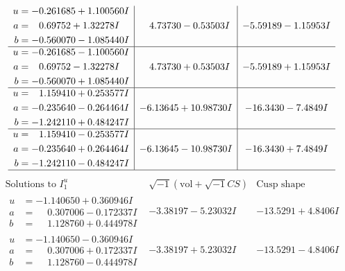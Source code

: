 \documentclass[1p]{elsarticle_modified}
\theoremstyle{definition}
\newcommand{\I}{\sqrt{-1}}
\begin{document}
$$\begin{array}{c|c|c}
\begin{aligned}
u &= -0.261685 + 1.100560 I \\
a &= \phantom{-}0.69752 + 1.32278 I \\
b &= -0.560070 - 1.085440 I\end{aligned}
 & \phantom{-}4.73730 - 0.53503 I & -5.59189 - 1.15953 I \\ \hline\begin{aligned}
u &= -0.261685 - 1.100560 I \\
a &= \phantom{-}0.69752 - 1.32278 I \\
b &= -0.560070 + 1.085440 I\end{aligned}
 & \phantom{-}4.73730 + 0.53503 I & -5.59189 + 1.15953 I \\ \hline\begin{aligned}
u &= \phantom{-}1.159410 + 0.253577 I \\
a &= -0.235640 - 0.264464 I \\
b &= -1.242110 + 0.484247 I\end{aligned}
 & -6.13645 + 10.98730 I & -16.3430 - 7.4849 I \\ \hline\begin{aligned}
u &= \phantom{-}1.159410 - 0.253577 I \\
a &= -0.235640 + 0.264464 I \\
b &= -1.242110 - 0.484247 I\end{aligned}
 & -6.13645 - 10.98730 I & -16.3430 + 7.4849 I\\
 \hline 
 \end{array}$$\newpage$$\begin{array}{c|c|c}  
\text{Solutions to }I^u_{1}& \I (\text{vol} + \sqrt{-1}CS) & \text{Cusp shape}\\
 \hline 
\begin{aligned}
u &= -1.140650 + 0.360946 I \\
a &= \phantom{-}0.307006 - 0.172337 I \\
b &= \phantom{-}1.128760 + 0.444978 I\end{aligned}
 & -3.38197 - 5.23032 I & -13.5291 + 4.8406 I \\ \hline\begin{aligned}
u &= -1.140650 - 0.360946 I \\
a &= \phantom{-}0.307006 + 0.172337 I \\
b &= \phantom{-}1.128760 - 0.444978 I\end{aligned}
 & -3.38197 + 5.23032 I & -13.5291 - 4.8406 I \\ \hline\begin{aligned}

\end{aligned}
\end{array}$$
\end{document}

